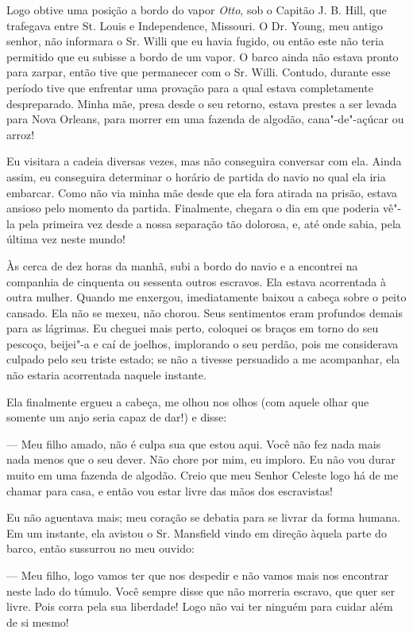 Logo obtive uma posição a bordo do vapor \emph{Otto}, sob o Capitão J.
B. Hill, que trafegava entre St. Louis e Independence, Missouri. O Dr.
Young, meu antigo senhor, não informara o Sr. Willi que eu havia fugido,
ou então este não teria permitido que eu subisse a bordo de um vapor. O
barco ainda não estava pronto para zarpar, então tive que permanecer com
o Sr. Willi. Contudo, durante esse período tive que enfrentar uma
provação para a qual estava completamente despreparado. Minha mãe, presa
desde o seu retorno, estava prestes a ser levada para Nova Orleans, para
morrer em uma fazenda de algodão, cana"-de"-açúcar ou arroz!

Eu visitara a cadeia diversas vezes, mas não conseguira conversar com
ela. Ainda assim, eu conseguira determinar o horário de partida do navio
no qual ela iria embarcar. Como não via minha mãe desde que ela fora
atirada na prisão, estava ansioso pelo momento da partida. Finalmente,
chegara o dia em que poderia vê"-la pela primeira vez desde a nossa
separação tão dolorosa, e, até onde sabia, pela última vez neste mundo!

Às cerca de dez horas da manhã, subi a bordo do navio e a encontrei na %
companhia de cinquenta ou sessenta outros escravos. Ela estava
acorrentada à outra mulher. Quando me enxergou, imediatamente baixou a
cabeça sobre o peito cansado. Ela não se mexeu, não chorou. Seus
sentimentos eram profundos demais para as lágrimas. Eu cheguei mais
perto, coloquei os braços em torno do seu pescoço, beijei"-a e caí de
joelhos, implorando o seu perdão, pois me considerava culpado pelo seu
triste estado; se não a tivesse persuadido a me acompanhar, ela não
estaria acorrentada naquele instante.

Ela finalmente ergueu a cabeça, me olhou nos olhos (com aquele olhar que
somente um anjo seria capaz de dar!) e disse:

--- Meu filho amado, não é culpa sua que estou aqui. Você não fez nada
mais nada menos que o seu dever. Não chore por mim, eu imploro. Eu não
vou durar muito em uma fazenda de algodão. Creio que meu Senhor Celeste
logo há de me chamar para casa, e então vou estar livre das mãos dos
escravistas!

Eu não aguentava mais; meu coração se debatia para se livrar da forma
humana. Em um instante, ela avistou o Sr. Mansfield vindo em direção
àquela parte do barco, então sussurrou no meu ouvido:

--- Meu filho, logo vamos ter que nos despedir e não vamos mais nos
encontrar neste lado do túmulo. Você sempre disse que não morreria
escravo, que quer ser livre. Pois corra pela sua liberdade! Logo não vai
ter ninguém para cuidar além de si mesmo!

